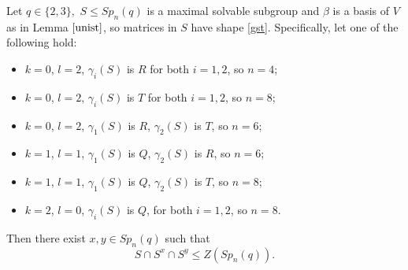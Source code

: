 \begin{Lem}\label{smSp23}
Let $q \in \{2,3\},$ $S \le Sp_n(q)$ is a maximal solvable subgroup and $\beta$ is a basis of $V$ as in Lemma $\ref{unist}$, so matrices in $S$ have shape \eqref{gst}. Specifically, let one of the following hold:
\begin{itemize}
\item $k=0$, $l=2$, $\gamma_i(S)$ is $R$   for both $i=1,2$, so $n=4$;
\item $k=0$, $l=2$, $\gamma_i(S)$ is $T$  for both $i=1,2$, so $n=8$;  
\item $k=0$, $l=2$,  $\gamma_1(S)$ is $R$, $\gamma_2(S)$ is $T$, so $n=6$;
\item $k=1$, $l=1$,  $\gamma_1(S)$ is $Q$, $\gamma_2(S)$ is $R$, so $n=6$;
\item $k=1$, $l=1$,  $\gamma_1(S)$ is $Q$, $\gamma_2(S)$ is $T$, so $n=8$;
\item $k=2$, $l=0$,  $\gamma_i(S)$ is $Q$, for both $i=1,2$, so $n=8$.
\end{itemize} 
Then there exist $x, y \in Sp_n(q)$ such that 
$$S \cap S^x \cap S^y \le Z(Sp_n(q)).$$
\end{Lem}

